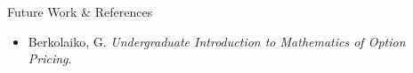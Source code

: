\documentclass[final]{beamer}
\newlength{\sepwidth}
\newlength{\colwidth}
\newcommand{\separatorcolumn}{\begin{column}{\sepwidth}\end{column}}
\begin{document}
\begin{frame}[t]
\begin{columns}[t]
\begin{column}{\colwidth}
\begin{block}{Future Work \& References}
    \small
    \begin{itemize}
      \setlength{\itemsep}{2pt}\setlength{\parsep}{0pt}
      \item Berkolaiko, G. \textit{Undergraduate Introduction to Mathematics of Option Pricing}.
    \end{itemize}

  \end{block}

\end{column}

\separatorcolumn
\end{columns}
\end{frame}
\end{document}
